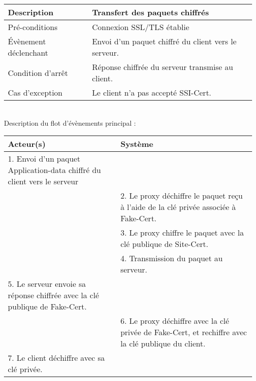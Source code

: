 
\begin{tabular}{|>{\columncolor[gray]{.8}}m{4cm}|m{12cm}|}
   \hline
   Description & Transfert des paquets chiffrés \\
   \hline
   Pré-conditions & Connexion SSL/TLS établie \\
   \hline
   Évènement déclenchant &  Envoi d'un paquet chiffré du client vers le serveur. \\
   \hline
   Condition d'arrêt & Réponse chiffrée du serveur transmise au client. \\
   \hline
   Cas d'exception  & Le client n'a pas accepté SSI-Cert. \\
   \hline   
\end{tabular}
~\\
Description du flot d'évènements principal :

\begin{tabular}{|m{8cm}|m{8cm}|}
   \hline
  \rowcolor[gray]{.8} Acteur(s) & Système \\
   \hline
   1. Envoi d'un paquet Application-data chiffré du client vers le serveur& \\
   \hline
& 2. Le proxy déchiffre le paquet reçu à l'aide de la clé privée associée à Fake-Cert. \\
& 3. Le proxy chiffre le paquet avec la clé publique de Site-Cert.  \\
   \hline
 & 4. Transmission du paquet au serveur. \\
   \hline
5. Le serveur envoie sa réponse chiffrée avec la clé publique de Fake-Cert. &  \\
   \hline
  &  6. Le proxy déchiffre avec la clé privée de Fake-Cert, et rechiffre avec la clé publique du client.   \\
   \hline
      7. Le client déchiffre avec sa clé privée. &  \\
   \hline
\end{tabular}